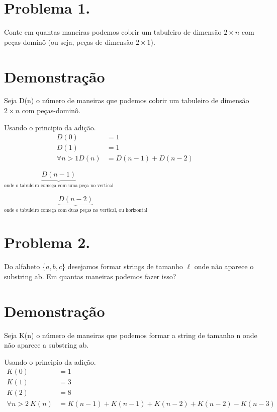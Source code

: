 \documentclass[a4paper]{article}
\author{Dawerton Eduardo Carlos Vaz }
\begin{document}
\section*{Problema 1.}
Conte em quantas maneiras podemos cobrir um tabuleiro de dimensão $2 \times n$ com peças-dominô (ou seja,
peças de dimensão $2 \times 1$).



\section*{Demonstração}

Seja D(n) o número de maneiras que podemos cobrir um tabuleiro de dimensão $2 \times n$ com peças-dominô.

Usando o principio da adição.
\begin{align*}
D(0)& = 1      &&    \\
D(1)& =1      &&   \\
\forall n>1 D(n)& =D(n-1) + D(n-2)
\end{align*}

$\underbrace{D(n-1)}_{\text{onde o tabuleiro começa com uma peça no vertical}}$

$\underbrace{D(n-2)}_{\text{{onde o tabuleiro começa com duas peças no vertical, ou horizontal}}}$

 \newpage
 \section*{Problema 2.}
 Do alfabeto \{$a, b, c$\} desejamos formar strings de tamanho $\ell$ onde não aparece o substring ab. Em quantas
maneiras podemos fazer isso?

\section*{Demonstração} 
Seja K(n) o número de maneiras que podemos formar a string de tamanho n onde não aparece a substring ab.

Usando o principio da adição.
\begin{align*}
K(0)& = 1      &&    \\
K(1)& =3      &&   \\
K(2)& =8      &&   \\
\forall n>2 \ K(n)& =K(n-1) + K(n-1) + K(n-2) + K(n-2) - K(n-3) \\
\end{align*}
\end{document}
